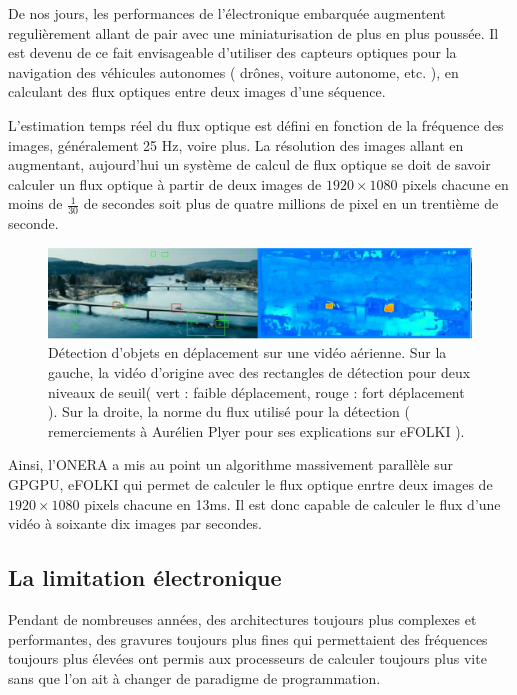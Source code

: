 \documentclass[fleqn,11pt]{article}
\begin{document}
De nos jours, les performances de l'électronique embarquée augmentent regulièrement allant de pair avec une miniaturisation de plus en plus poussée. Il est devenu de ce fait envisageable d'utiliser des capteurs optiques pour la navigation des véhicules autonomes  ( drônes, voiture autonome, etc. ), en calculant des flux optiques entre deux images d'une séquence. 

L'estimation temps réel du flux optique est défini en fonction de la fréquence des images, généralement 25 Hz, voire plus. La résolution des images allant en augmentant, aujourd'hui un système de calcul de flux optique se doit de savoir calculer un flux optique à partir de deux images de $1920\times 1080$ pixels chacune en moins de $\frac{1}{30}$ de secondes soit plus de quatre millions de pixel en un trentième de seconde.

\begin{figure}[h]
\includegraphics[width=\textwidth]{fluxvideo}
\caption{Détection d'objets en déplacement sur une vidéo aérienne. Sur la gauche, la vidéo d'origine avec des rectangles de détection pour deux niveaux de seuil( vert : faible déplacement, rouge : fort déplacement ). Sur la droite, la norme du flux utilisé pour la détection ( remerciements à Aurélien Plyer pour ses explications sur eFOLKI ).}
\end{figure}

Ainsi, l'ONERA a mis au point un algorithme massivement parallèle sur GPGPU, eFOLKI qui permet de calculer le flux optique enrtre deux images de $1920\times 1080$ pixels chacune en 13ms. Il est donc capable de calculer le flux d'une vidéo à soixante dix images par secondes.

\subsection{La limitation électronique}

Pendant de nombreuses années, des architectures toujours plus complexes et performantes, des gravures toujours plus fines qui permettaient des fréquences toujours plus élevées ont permis aux processeurs de calculer toujours plus vite sans que l'on ait à changer de paradigme de programmation.  
\end{document}
